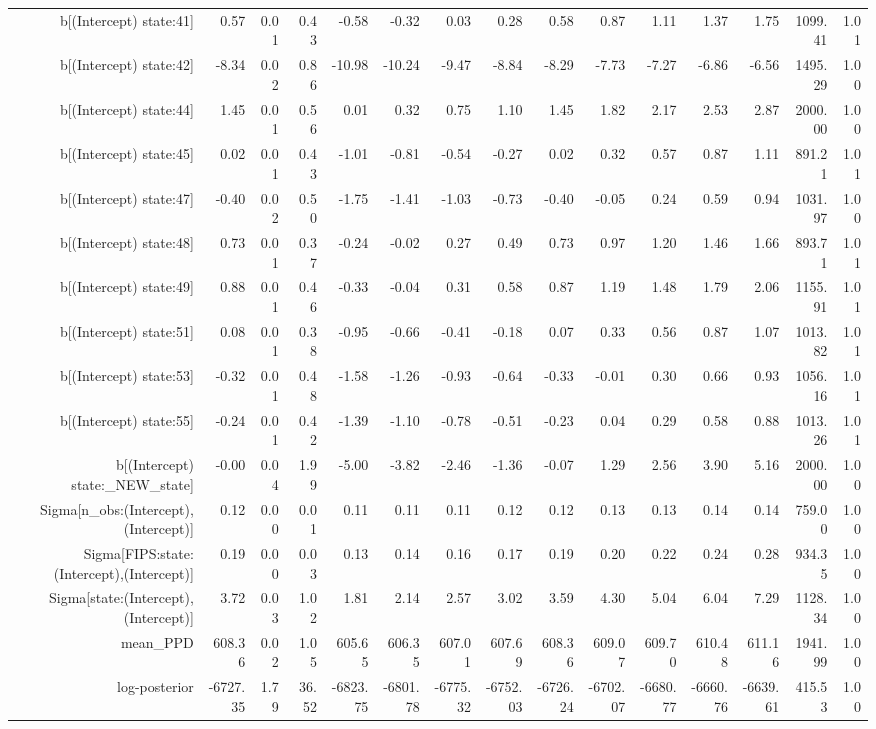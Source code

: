 \begin{table}[ht]
\begin{tabular}{rrrrrrrrrrrrrrr}
  b[(Intercept) state:41] & 0.57 & 0.01 & 0.43 & -0.58 & -0.32 & 0.03 & 0.28 & 0.58 & 0.87 & 1.11 & 1.37 & 1.75 & 1099.41 & 1.01 \\ 
  b[(Intercept) state:42] & -8.34 & 0.02 & 0.86 & -10.98 & -10.24 & -9.47 & -8.84 & -8.29 & -7.73 & -7.27 & -6.86 & -6.56 & 1495.29 & 1.00 \\ 
  b[(Intercept) state:44] & 1.45 & 0.01 & 0.56 & 0.01 & 0.32 & 0.75 & 1.10 & 1.45 & 1.82 & 2.17 & 2.53 & 2.87 & 2000.00 & 1.00 \\ 
  b[(Intercept) state:45] & 0.02 & 0.01 & 0.43 & -1.01 & -0.81 & -0.54 & -0.27 & 0.02 & 0.32 & 0.57 & 0.87 & 1.11 & 891.21 & 1.01 \\ 
  b[(Intercept) state:47] & -0.40 & 0.02 & 0.50 & -1.75 & -1.41 & -1.03 & -0.73 & -0.40 & -0.05 & 0.24 & 0.59 & 0.94 & 1031.97 & 1.00 \\ 
  b[(Intercept) state:48] & 0.73 & 0.01 & 0.37 & -0.24 & -0.02 & 0.27 & 0.49 & 0.73 & 0.97 & 1.20 & 1.46 & 1.66 & 893.71 & 1.01 \\ 
  b[(Intercept) state:49] & 0.88 & 0.01 & 0.46 & -0.33 & -0.04 & 0.31 & 0.58 & 0.87 & 1.19 & 1.48 & 1.79 & 2.06 & 1155.91 & 1.01 \\ 
  b[(Intercept) state:51] & 0.08 & 0.01 & 0.38 & -0.95 & -0.66 & -0.41 & -0.18 & 0.07 & 0.33 & 0.56 & 0.87 & 1.07 & 1013.82 & 1.01 \\ 
  b[(Intercept) state:53] & -0.32 & 0.01 & 0.48 & -1.58 & -1.26 & -0.93 & -0.64 & -0.33 & -0.01 & 0.30 & 0.66 & 0.93 & 1056.16 & 1.01 \\ 
  b[(Intercept) state:55] & -0.24 & 0.01 & 0.42 & -1.39 & -1.10 & -0.78 & -0.51 & -0.23 & 0.04 & 0.29 & 0.58 & 0.88 & 1013.26 & 1.01 \\ 
  b[(Intercept) state:\_NEW\_state] & -0.00 & 0.04 & 1.99 & -5.00 & -3.82 & -2.46 & -1.36 & -0.07 & 1.29 & 2.56 & 3.90 & 5.16 & 2000.00 & 1.00 \\ 
  Sigma[n\_obs:(Intercept),(Intercept)] & 0.12 & 0.00 & 0.01 & 0.11 & 0.11 & 0.11 & 0.12 & 0.12 & 0.13 & 0.13 & 0.14 & 0.14 & 759.00 & 1.00 \\ 
  Sigma[FIPS:state:(Intercept),(Intercept)] & 0.19 & 0.00 & 0.03 & 0.13 & 0.14 & 0.16 & 0.17 & 0.19 & 0.20 & 0.22 & 0.24 & 0.28 & 934.35 & 1.00 \\ 
  Sigma[state:(Intercept),(Intercept)] & 3.72 & 0.03 & 1.02 & 1.81 & 2.14 & 2.57 & 3.02 & 3.59 & 4.30 & 5.04 & 6.04 & 7.29 & 1128.34 & 1.00 \\ 
  mean\_PPD & 608.36 & 0.02 & 1.05 & 605.65 & 606.35 & 607.01 & 607.69 & 608.36 & 609.07 & 609.70 & 610.48 & 611.16 & 1941.99 & 1.00 \\ 
  log-posterior & -6727.35 & 1.79 & 36.52 & -6823.75 & -6801.78 & -6775.32 & -6752.03 & -6726.24 & -6702.07 & -6680.77 & -6660.76 & -6639.61 & 415.53 & 1.00 \\ 
   \hline
\end{tabular}
\end{table}
